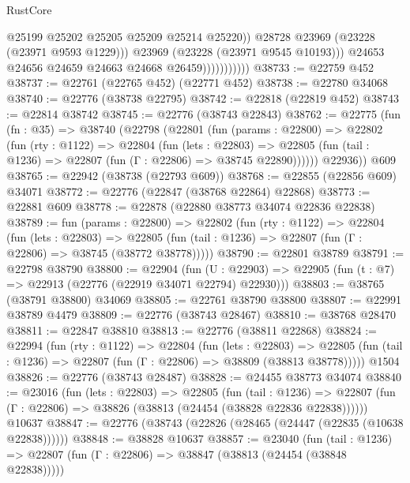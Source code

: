 \begin{lexlean}{RustCore}
\begin{coremodule}
                                  @25199
                                  @25202
                                  @25205
                                  @25209
                                  @25214
                                  @25220))
                              @28728
                              @23969
                              (@23228 (@23971 @9593 @1229)))
                            @23969
                            (@23228 (@23971 @9545 @10193)))
                          @24653
                          @24656
                          @24659
                          @24663
                          @24668
                          @26459)))))))))))
@38733 := @22759 @452
@38737 := @22761 (@22765 @452) (@22771 @452)
@38738 := @22780 @34068
@38740 := @22776 (@38738 @22795)
@38742 := @22818 (@22819 @452)
@38743 := @22814 @38742
@38745 := @22776 (@38743 @22843)
@38762 := @22775
    (fun (fn : @35) =>
    @38740
      (@22798
        (@22801
          (fun (params : @22800) =>
          @22802
            (fun (rty : @1122) =>
            @22804
              (fun (lets : @22803) =>
              @22805 (fun (tail : @1236) => @22807 (fun (Γ : @22806) => @38745 @22890))))))
        @22936))
    @609
@38765 := @22942 (@38738 (@22793 @609))
@38768 := @22855 (@22856 @609) @34071
@38772 := @22776 (@22847 (@38768 @22864) @22868)
@38773 := @22881 @609
@38778 := @22878 (@22880 @38773 @34074 @22836 @22838)
@38789 := fun (params : @22800) =>
  @22802
    (fun (rty : @1122) =>
    @22804
      (fun (lets : @22803) =>
      @22805 (fun (tail : @1236) => @22807 (fun (Γ : @22806) => @38745 (@38772 @38778)))))
@38790 := @22801 @38789
@38791 := @22798 @38790
@38800 := @22904
    (fun (U : @22903) => @22905 (fun (t : @7) => @22913 (@22776 (@22919 @34071 @22794) @22930)))
@38803 := @38765 (@38791 @38800) @34069
@38805 := @22761 @38790 @38800
@38807 := @22991 @38789 @4479
@38809 := @22776 (@38743 @28467)
@38810 := @38768 @28470
@38811 := @22847 @38810
@38813 := @22776 (@38811 @22868)
@38824 := @22994
    (fun (rty : @1122) =>
    @22804
      (fun (lets : @22803) =>
      @22805 (fun (tail : @1236) => @22807 (fun (Γ : @22806) => @38809 (@38813 @38778)))))
    @1504
@38826 := @22776 (@38743 @28487)
@38828 := @24455 @38773 @34074
@38840 := @23016
    (fun (lets : @22803) =>
    @22805
      (fun (tail : @1236) =>
      @22807 (fun (Γ : @22806) => @38826 (@38813 (@24454 (@38828 @22836 @22838))))))
    @10637
@38847 := @22776 (@38743 (@22826 (@28465 (@24447 (@22835 (@10638 @22838))))))
@38848 := @38828 @10637
@38857 := @23040
    (fun (tail : @1236) => @22807 (fun (Γ : @22806) => @38847 (@38813 (@24454 (@38848 @22838)))))

\end{coremodule}
\end{lexlean}
